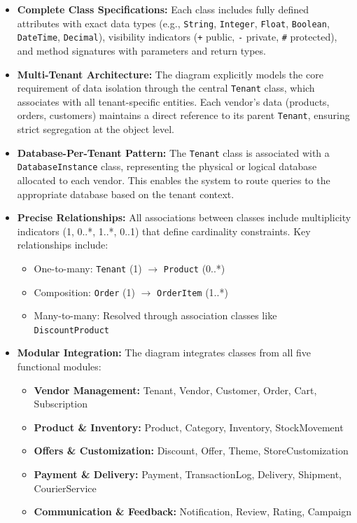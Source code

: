 \begin{itemize}
    \item \textbf{Complete Class Specifications:} Each class includes fully defined attributes with exact data types (e.g., \texttt{String}, \texttt{Integer}, \texttt{Float}, \texttt{Boolean}, \texttt{DateTime}, \texttt{Decimal}), visibility indicators (\texttt{+} public, \texttt{-} private, \texttt{\#} protected), and method signatures with parameters and return types.
    
    \item \textbf{Multi-Tenant Architecture:} The diagram explicitly models the core requirement of data isolation through the central \texttt{Tenant} class, which associates with all tenant-specific entities. Each vendor's data (products, orders, customers) maintains a direct reference to its parent \texttt{Tenant}, ensuring strict segregation at the object level.
    
    \item \textbf{Database-Per-Tenant Pattern:} The \texttt{Tenant} class is associated with a\\ \texttt{DatabaseInstance} class, representing the physical or logical database allocated to each vendor. This enables the system to route queries to the appropriate database based on the tenant context.
    
    \item \textbf{Precise Relationships:} All associations between classes include multiplicity indicators (1, 0..*, 1..*, 0..1) that define cardinality constraints. Key relationships include:
    \begin{itemize}
        \item One-to-many: \texttt{Tenant} (1) $\rightarrow$ \texttt{Product} (0..*)
        \item Composition: \texttt{Order} (1) $\rightarrow$ \texttt{OrderItem} (1..*)
        \item Many-to-many: Resolved through association classes like \texttt{DiscountProduct}
    \end{itemize}
    
    \item \textbf{Modular Integration:} The diagram integrates classes from all five functional modules:
    \begin{itemize}
        \item \textbf{Vendor Management:} Tenant, Vendor, Customer, Order, Cart, Subscription
        \item \textbf{Product \& Inventory:} Product, Category, Inventory, StockMovement
        \item \textbf{Offers \& Customization:} Discount, Offer, Theme, StoreCustomization
        \item \textbf{Payment \& Delivery:} Payment, TransactionLog, Delivery, Shipment, CourierService
        \item \textbf{Communication \& Feedback:} Notification, Review, Rating, Campaign
    \end{itemize}
\end{itemize}

